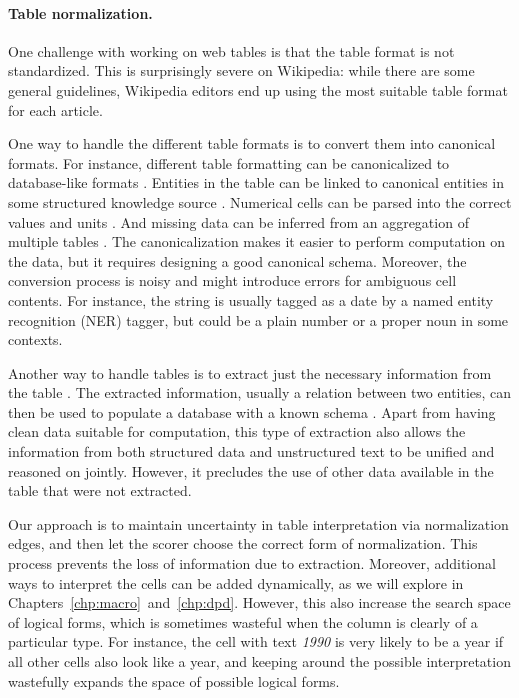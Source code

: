 \paragraph{Table normalization.}
One challenge with working on web tables is that
the table format is not standardized.
This is surprisingly severe on Wikipedia:
while there are some general guidelines,
Wikipedia editors end up using
the most suitable table format for each article.

One way to handle the different table formats
is to convert them into canonical formats.
For instance, different table formatting can be canonicalized
to database-like formats
\cite{embley2016converting}.
Entities in the table can be linked to canonical entities
in some structured knowledge source
\cite{limaye2010annotating,bhagavatula2015tabel}.
Numerical cells can be parsed into the correct
values and units
\cite{madaan2016numerical}.
And missing data can be inferred
from an aggregation of multiple tables
\cite{venetis2011recovering}.
The canonicalization makes it easier
to perform computation on the data,
but it requires designing a good canonical schema.
Moreover, the conversion process is noisy
and might introduce errors for ambiguous cell contents.
For instance, the string
 is usually tagged as a date by a
named entity recognition (NER) tagger,
but could be a plain number
or a proper noun in some contexts.

Another way to handle tables
is to extract just the necessary information from the table
\cite{govindaraju2013understanding,zhang2015deepdive}.
The extracted information,
usually a relation between two entities,
can then be used to populate a database
with a known schema
\cite{ellis2015tackbp}.
Apart from having clean data suitable for computation,
this type of extraction also
allows the information from both structured data
and unstructured text to be unified and reasoned on jointly.
However,
it precludes the use of other data
available in the table that were not extracted.

Our approach is to maintain uncertainty in
table interpretation via normalization edges,
and then let the scorer
choose the correct
form of normalization.
This process prevents the loss of information
due to extraction.
Moreover, additional ways to interpret the cells
can be added dynamically,
as we will explore in Chapters~\ref{chp:macro}~and~\ref{chp:dpd}.
However, this also increase the search space of logical forms,
which is sometimes wasteful when the column
is clearly of a particular type.
For instance, the cell with text \emph{1990} is very likely to be a year
if all other cells also look like a year,
and keeping around the possible  interpretation
wastefully expands the space of possible logical forms.


